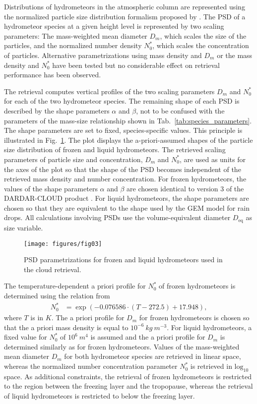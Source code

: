 \documentclass[journal abbreviation, manuscript]{copernicus}
\begin{document}
Distributions of hydrometeors in the atmospheric column are represented using
the normalized particle size distribution formalism proposed by
\cite{delanoe05}. The PSD of a hydrometeor species at a given height level is
represented by two scaling parameters: The mass-weighted mean diameter $D_m$,
which scales the size of the particles, and the normalized number density
$N_0^*$, which scales the concentration of particles. Alternative
parametrizations using mass density and $D_m$ or the mass density and $N_0^*$
have been tested but no considerable effect on retrieval performance has been
observed.

The retrieval computes vertical profiles of the two scaling parameters $D_m$ and
$N_0^*$ for each of the two hydrometeor species. The remaining shape of each PSD
is described by the shape parameters $\alpha$ and $\beta$, not to be confused
with the parameters of the mass-size relationship shown in
Tab.~\ref{tab:species_parameters}. The shape parameters are set to fixed,
species-specific values. This principle is illustrated in
Fig.~\ref{fig:psds_retrieval}. The plot displays the a-priori-assumed shapes of
the particle size distribution of frozen and liquid hydrometeors. The retrieved
scaling parameters of particle size and concentration, $D_m$ and $N_0^*$, are
used as units for the axes of the plot so that the shape of the PSD becomes
independent of the retrieved mass density and number concentration. For frozen
hydrometeors, the values of the shape parameters $\alpha$ and $\beta$ are chosen
identical to version 3 of the DARDAR-CLOUD product \citep{cazenave18}. For
liquid hydrometeors, the shape parameters are chosen so that they are equivalent
to the shape used by the GEM model for rain drops. All calculations involving
PSDs use the volume-equivalent diameter $D_\text{eq}$ as size variable.

\begin{figure}
\centering
\texttt{[image: figures/fig03]}
\caption{PSD parametrizations for frozen and liquid hydrometeors
 used in the cloud retrieval.}
\label{fig:psds_retrieval}
\end{figure}

The temperature-dependent a priori profile for $N_0^*$ of frozen
hydrometeors is determined using the relation from \cite{delanoe14}
%
\begin{align}
N_0^* &= \exp \left ( -0.076586 \cdot (T - 272.5) + 17.948 \right ),
\end{align}
%
where $T$ is in $\unit{K}$. The a priori profile for $D_m$ for frozen
hydrometeors is chosen so that the a priori mass density is equal to
$10^{-6}\ \unit{kg\ m^{-3}}$. For liquid hydrometeors, a fixed value for $N_0^*$ of
$10^6\ \unit{m^4}$ is assumed and the a priori profile for $D_m$ is determined
similarly as for frozen hydrometeors. Values of the mass-weighted mean diameter
$D_m$ for both hydrometeor species are retrieved in linear space, whereas the
normalized number concentration parameter $N_0^*$ is retrieved in
$\text{log}_{10}$ space. As additional constraints, the retrieval of frozen
hydrometeors is restricted to the region between the freezing layer and the
tropopause, whereas the retrieval of liquid hydrometeors is restricted to below
the freezing layer.
\end{document}
